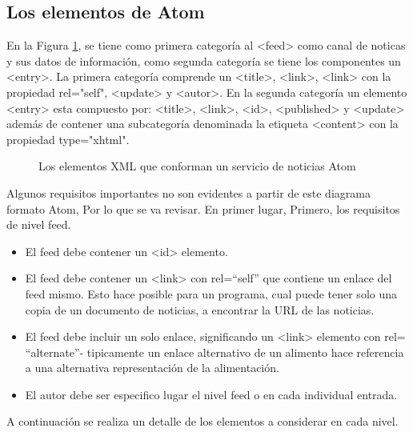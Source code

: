 \subsection{Los elementos de Atom}

En la Figura \ref{Los elementos XML que conforman un servicio de noticias Atom}, 
se tiene como primera categor\'{i}a al <feed> como canal de noticas y sus datos
de informaci\'{o}n, como segunda categor\'{i}a se tiene los componentes un <entry>.
La primera categor\'{i}a comprende un <title>, <link>, <link> con la
propiedad rel="self", <update> y <autor>. En la segunda categor\'{i}a un elemento
<entry> esta compuesto por: <title>, <link>, <id>, <published> y <update> adem\'{a}s
de contener una subcategor\'{i}a denominada la etiqueta <content> con la propiedad
type="xhtml".

\begin{figure}[!ht]
	\centering
	\caption{Los elementos XML que conforman un servicio de noticias Atom}
	\label{Los elementos XML que conforman un servicio de noticias Atom}
\end{figure}


Algunos requisitos importantes no son evidentes a partir de este diagrama formato
Atom, Por lo que se va revisar. En primer lugar, Primero, los requisitos de nivel feed.

\begin{itemize}

\item El feed debe contener un <id> elemento.
\item El feed debe contener un <link> con rel=\textquotedblleft self\textquotedblright 
que contiene un enlace del feed mismo. Esto hace posible para un programa, cual puede
tener solo una copia de un documento de noticias, a encontrar la URL de las noticias.
\item El feed debe incluir un solo enlace, significando un <link> elemento con rel=
\textquotedblleft alternate\textquotedblright - tipicamente un enlace alternativo de
un alimento hace referencia a una alternativa representación de la alimentación.
\item El autor debe ser especifico lugar el nivel feed o en cada individual entrada.

\end{itemize}

A continuaci\'{o}n se realiza un detalle de los elementos a considerar en cada nivel.


